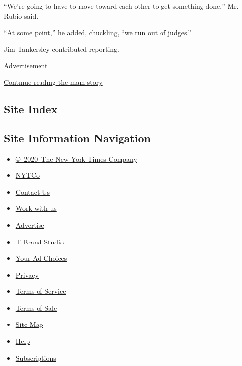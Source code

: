 ``We're going to have to move toward each other to get something done,''
Mr. Rubio said.

``At some point,'' he added, chuckling, ``we run out of judges.''

Jim Tankersley contributed reporting.

Advertisement

\protect\hyperlink{after-bottom}{Continue reading the main story}

\hypertarget{site-index}{%
\subsection{Site Index}\label{site-index}}

\hypertarget{site-information-navigation}{%
\subsection{Site Information
Navigation}\label{site-information-navigation}}

\begin{itemize}
\tightlist
\item
  \href{https://help.nytimes.com/hc/en-us/articles/115014792127-Copyright-notice}{©~2020~The
  New York Times Company}
\end{itemize}

\begin{itemize}
\tightlist
\item
  \href{https://www.nytco.com/}{NYTCo}
\item
  \href{https://help.nytimes.com/hc/en-us/articles/115015385887-Contact-Us}{Contact
  Us}
\item
  \href{https://www.nytco.com/careers/}{Work with us}
\item
  \href{https://nytmediakit.com/}{Advertise}
\item
  \href{http://www.tbrandstudio.com/}{T Brand Studio}
\item
  \href{https://www.nytimes.com/privacy/cookie-policy\#how-do-i-manage-trackers}{Your
  Ad Choices}
\item
  \href{https://www.nytimes.com/privacy}{Privacy}
\item
  \href{https://help.nytimes.com/hc/en-us/articles/115014893428-Terms-of-service}{Terms
  of Service}
\item
  \href{https://help.nytimes.com/hc/en-us/articles/115014893968-Terms-of-sale}{Terms
  of Sale}
\item
  \href{https://spiderbites.nytimes.com}{Site Map}
\item
  \href{https://help.nytimes.com/hc/en-us}{Help}
\item
  \href{https://www.nytimes.com/subscription?campaignId=37WXW}{Subscriptions}
\end{itemize}
